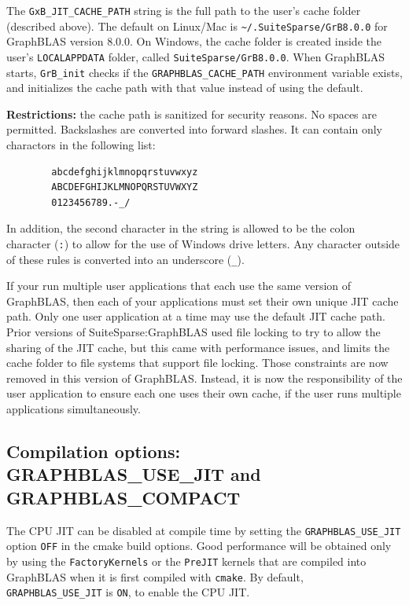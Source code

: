 The \verb'GxB_JIT_CACHE_PATH' string is the full path to the user's cache
folder (described above).  The default on Linux/Mac is
\verb'~/.SuiteSparse/GrB8.0.0' for GraphBLAS version 8.0.0.  On Windows,
the cache folder is created inside the user's \verb'LOCALAPPDATA' folder,
called \verb'SuiteSparse/GrB8.0.0'.  When GraphBLAS starts,
\verb'GrB_init' checks if the \verb'GRAPHBLAS_CACHE_PATH' environment variable
exists, and initializes the cache path with that value instead of using the
default.

{\bf Restrictions:} the cache path is sanitized for security reasons.  No spaces
are permitted.  Backslashes are converted into forward slashes.  It can contain
only charactors in the following list:

\begin{verbatim}
        abcdefghijklmnopqrstuvwxyz
        ABCDEFGHIJKLMNOPQRSTUVWXYZ
        0123456789.-_/
\end{verbatim}

In addition, the second character in the string is allowed to be the colon
character (\verb':') to allow for the use of Windows drive letters.  Any
character outside of these rules is converted into an underscore (\verb'_').

If your run multiple user applications that each use the same version of
GraphBLAS, then each of your applications must set their own unique JIT cache
path.  Only one user application at a time may use the default JIT cache path.
Prior versions of SuiteSparse:GraphBLAS used file locking to try to allow the
sharing of the JIT cache, but this came with performance issues, and limits the
cache folder to file systems that support file locking.  Those constraints are
now removed in this version of GraphBLAS.  Instead, it is now the
responsibility of the user application to ensure each one uses their own cache,
if the user runs multiple applications simultaneously.

\subsection{Compilation options: {\sf GRAPHBLAS\_USE\_JIT} and {\sf GRAPHBLAS\_COMPACT}}

The CPU JIT can be disabled at compile time by setting the
\verb'GRAPHBLAS_USE_JIT' option \verb'OFF' in the cmake build options.  Good
performance will be obtained only by using the \verb'FactoryKernels' or the
\verb'PreJIT' kernels that are compiled into GraphBLAS when it is first
compiled with \verb'cmake'.  By default, \verb'GRAPHBLAS_USE_JIT' is \verb'ON',
to enable the CPU JIT.

